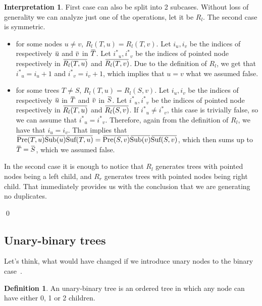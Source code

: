 \documentclass[final]{article}
\theoremstyle{definition}
\newtheorem{definition}{Definition}[subsection]
\theoremstyle{definition}
\newtheorem{interpretation}{Interpretation}[subsection]
\theoremstyle{remark}
\newcommand{\ols}[1]{\mskip.5\thinmuskip\overline{\mskip-.5\thinmuskip {#1} \mskip-.5\thinmuskip}\mskip.5\thinmuskip} %
\newcommand{\enc}[1]{\ensuremath{\ols{#1}}}
\newcommand{\pointed}[1]{\ensuremath{{#1}^*}}
\DeclareMathOperator{\tSub}{\text{Sub}}
\DeclareMathOperator{\tPre}{\text{Pre}}
\DeclareMathOperator{\tSuf}{\text{Suf}}
\begin{document}
\begin{interpretation}
First case can also be split into 2 subcases. Without loss of generality we can analyze just one of the operations, let it be \(R_l\). The second case is symmetric.
\begin{itemize}
    \item for some nodes \(u \neq v\), \(R_l(T, u) = R_l(T, v)\). Let \(i_u, i_v\) be the indices of respectively \(\enc{u}\) and \(\enc{v}\) in \(\enc{T}\). Let \(\pointed{i}_u, \pointed{i}_v\) be the indices of pointed node respectively in \(\enc{R_l(T, u)}\) and \(\enc{R_l(T, v)}\). Due to the definition of \(R_l\), we get that \(\pointed{i}_u = i_u + 1\) and \(\pointed{i}_v = i_v + 1\), which implies that \(u = v\) what we assumed false.
    \item for some trees \(T \neq S\), \(R_l(T, u) = R_l(S, v)\). Let \(i_u, i_v\) be the indices of respectively \(\enc{u}\) in \(\enc{T}\) and \(\enc{v}\) in \(\enc{S}\). Let \(\pointed{i}_u, \pointed{i}_v\) be the indices of pointed node respectively in \(\enc{R_l(T, u)}\) and \(\enc{R_l(S, v)}\). If \(\pointed{i}_u \neq \pointed{i}_v\), this case is trivially false, so we can assume that \(\pointed{i}_u = \pointed{i}_v\). Therefore, again from the definition of \(R_l\), we have that \(i_u = i_v\). That implies that \(\enc{\tPre(T, u)} \enc{\tSub(u)} \enc{\tSuf(T, u)} = \enc{\tPre(S, v)} \enc{\tSub(v)} \enc{\tSuf(S, v)} \), which then sums up to \(\enc{T} = \enc{S}\), which we assumed false.
\end{itemize}

In the second case it is enough to notice that \(R_l\) generates trees with pointed nodes being a left child, and \(R_r\) generates trees with pointed nodes being right child. That immediately provides us with the conclusion that we are generating no duplicates.

\qed
\end{interpretation}

\subsection{Unary-binary trees}%
\label{sub:unary_binary_trees}

Let's think, what would have changed if we introduce unary nodes to the binary case~\cite{motzkin}.

\begin{definition}
    \label{def:unary_binary_tree}
    An unary-binary tree is an ordered tree in which any node can have either 0, 1 or 2 children.
\end{definition}
\end{document}
